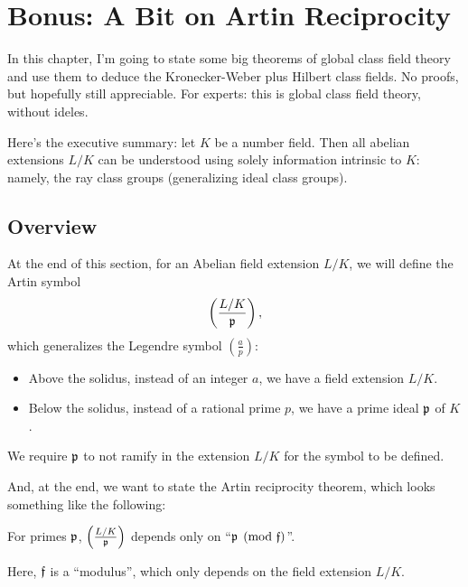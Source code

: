 \chapter{Bonus: A Bit on Artin Reciprocity}
In this chapter, I'm going to state some big theorems of
global class field theory and use them to deduce the
Kronecker-Weber plus Hilbert class fields.
No proofs, but hopefully still appreciable.
For experts: this is global class field theory, without ideles.

Here's the executive summary: let $K$ be a number field.
Then all abelian extensions $L/K$ can be understood
using solely information intrinsic to $K$:
namely, the ray class groups (generalizing ideal class groups).

\section{Overview}

At the end of this section, for an Abelian field extension $L/K$, we will define
the Artin symbol
\[ \left( \frac{L/K}{\mathfrak p} \right), \]
which generalizes the Legendre symbol $\left( \frac{a}{p} \right)$:
\begin{itemize}
	\item Above the solidus, instead of an integer $a$, we have a field
		extension $L/K$.
	\item Below the solidus, instead of a rational prime $p$, we have a prime
		ideal $\mathfrak p$ of $K$.
\end{itemize}

We require $\mathfrak p$ to not ramify in the extension $L/K$ for the symbol to be
defined.

And, at the end, we want to state the Artin reciprocity theorem, which looks
something like the following:
\begin{moral}
	For primes $\mathfrak p$,
	$\left( \frac{L/K}{\mathfrak p} \right)$ depends
	only on ``$\mathfrak p \pmod {\mathfrak f}$''.
\end{moral}

Here, $\mathfrak f$ is a ``modulus'', which only depends on the field extension $L/K$.

